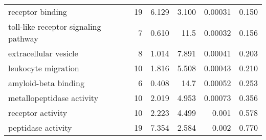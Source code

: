 \begin{longtable}{lrrrrr}
                             receptor binding &                      19 &                   6.129 &      3.100 &              0.00031 &                0.150 \\
         toll-like receptor signaling pathway &                       7 &                   0.610 &       11.5 &              0.00032 &                0.156 \\
                        extracellular vesicle &                       8 &                   1.014 &      7.891 &              0.00041 &                0.203 \\
                          leukocyte migration &                      10 &                   1.816 &      5.508 &              0.00043 &                0.210 \\
                         amyloid-beta binding &                       6 &                   0.408 &       14.7 &              0.00052 &                0.253 \\
                    metallopeptidase activity &                      10 &                   2.019 &      4.953 &              0.00073 &                0.356 \\
                            receptor activity &                      10 &                   2.223 &      4.499 &                0.001 &                0.578 \\
                           peptidase activity &                      19 &                   7.354 &      2.584 &                0.002 &                0.770 \\
\end{longtable}
